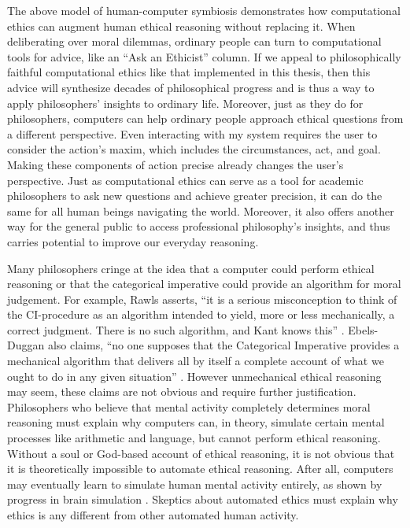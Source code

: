 \begin{isabellebody}
\begin{isamarkuptext}
The above model of human-computer symbiosis demonstrates how computational ethics can augment human
ethical reasoning without replacing it. When deliberating over moral dilemmas, ordinary people can 
turn to computational tools for advice, like an ``Ask an Ethicist'' column. If we appeal to philosophically
faithful computational ethics like that implemented in this thesis, then this advice will synthesize 
decades of philosophical progress and is thus a way to apply philosophers' insights to ordinary life. 
Moreover, just as they do for philosophers, computers can help ordinary people approach ethical questions from a 
different perspective. Even interacting with my system requires the user to consider the action's maxim, 
which includes the circumstances, act, and goal. Making these components of action precise already changes
the user's perspective. Just as computational ethics can serve as a tool for academic philosophers to 
ask new questions and achieve greater precision, it can do the same for all human beings navigating
the world. Moreover, it also offers another way for the general public to access professional philosophy's
insights, and thus carries potential to improve our everyday reasoning.%
\end{isamarkuptext}\isamarkuptrue%
%
\isadelimdocument
%
\endisadelimdocument
%
\isatagdocument
%
\isamarkuptrue%
%
\endisatagdocument
{\isafolddocument}%
%
\isadelimdocument
%
\endisadelimdocument
%
\begin{isamarkuptext}%
Many philosophers cringe at the idea that a computer could perform ethical reasoning or that the 
categorical imperative could provide an algorithm for moral judgement. For example, Rawls asserts, 
``it is a serious misconception to think of the CI-procedure as an algorithm intended to yield, 
more or less mechanically, a correct judgment. There is no such algorithm, and Kant knows this'' \citep[166]{rawlslectures}. 
Ebels-Duggan also claims, ``no one supposes that the Categorical Imperative provides a mechanical 
algorithm that delivers all by itself a complete account of what we ought to do in any given 
situation'' \citep[174]{ebelsduggan}. However unmechanical ethical reasoning
may seem, these claims are not obvious and require further justification. Philosophers who believe 
that mental activity completely determines moral reasoning must explain why computers can, in theory, 
simulate certain mental processes like arithmetic and language, but cannot perform ethical reasoning. 
Without a soul or God-based account of ethical reasoning, it is not obvious that it is theoretically 
impossible to automate ethical reasoning. After all, computers may eventually learn to simulate human 
mental activity entirely, as shown by progress in brain simulation \citep{brainsimulation}. Skeptics
about automated ethics must explain why ethics is any different from other automated human activity.


\end{isamarkuptext}
\end{isabellebody}
